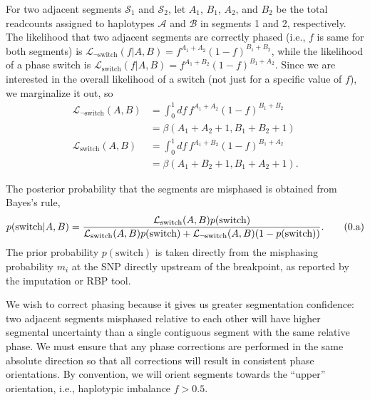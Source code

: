 \documentclass[10pt,letter]{article}
\numberwithin{equation}{section}
\newcommand{\btag}[1]{\addtocounter{equation}{1}\label{#1}\tag{\arabic{section}.\alph{equation}}}
\begin{document}
For two adjacent segments $\mathcal{S}_1$ and $\mathcal{S}_2$, let $A_1$, $B_1$, $A_2$, and $B_2$ be the total readcounts assigned to haplotypes $\mathcal A$ and $\mathcal B$ in segments 1 and 2, respectively. The likelihood that two adjacent segments are correctly phased (i.e., $f$ is same for both segments) is $\mathcal{L}_{\neg\text{switch}}(f|A,B)=f^{A_1+A_2}(1-f)^{B_1+B_2}$, while the likelihood of a phase switch is $\mathcal{L}_{\text{switch}}(f|A,B)=f^{A_1 + B_2}(1-f)^{B_1+A_2}$. Since we are interested in the overall likelihood of a switch (not just for a specific value of $f$), we marginalize it out, so
\begin{align*}
\mathcal{L}_{\neg\text{switch}}(A,B)&=\int_0^1 df\,f^{A_1+A_2}(1-f)^{B_1+B_2}\\
&=\beta(A_1+A_2+1,B_1+B_2+1)\\
\mathcal{L}_{\text{switch}}(A,B)&=\int_0^1 df\, f^{A_1 + B_2}(1-f)^{B_1+A_2}\\
&=\beta(A_1+B_2+1,B_1+A_2+1).
\end{align*}

The posterior probability that the segments are misphased is obtained from Bayes's rule,
\begin{align*}
p(\text{switch}|A,B) = \frac{\mathcal{L}_{\text{switch}}(A,B)p(\text{switch})}{\mathcal{L}_{\text{switch}}(A,B)p(\text{switch})+\mathcal{L}_{\neg\text{switch}}(A,B)(1-p(\text{switch}))}.\btag{pswitch}
\end{align*}
The prior probability $p(\text{switch})$ is taken directly from the misphasing probability $m_i$ at the SNP directly upstream of the breakpoint, as reported by the imputation or RBP tool.

We wish to correct phasing because it gives us greater segmentation confidence: two adjacent segments misphased relative to each other will have higher segmental uncertainty than a single contiguous segment with the same relative phase. We must ensure that any phase corrections are performed in the same absolute direction
so that all corrections will result in consistent phase orientations. By convention, we will orient segments towards the ``upper'' orientation, i.e., haplotypic imbalance $f>0.5$.
\end{document}
